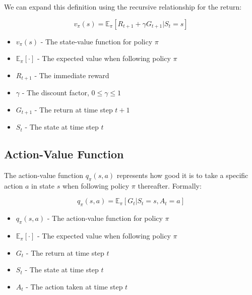\documentclass[12pt,a4paper]{article}
\begin{document}
We can expand this definition using the recursive relationship for the return:

\begin{equation}
v_\pi(s) = \mathbb{E}_\pi[R_{t+1} + \gamma G_{t+1} | S_t = s]
\end{equation}

\begin{tcolorbox}[title=Notation Overview]
\begin{itemize}
    \item $v_\pi(s)$ - The state-value function for policy $\pi$
    \item $\mathbb{E}_\pi[\cdot]$ - The expected value when following policy $\pi$
    \item $R_{t+1}$ - The immediate reward
    \item $\gamma$ - The discount factor, $0 \leq \gamma \leq 1$
    \item $G_{t+1}$ - The return at time step $t+1$
    \item $S_t$ - The state at time step $t$
\end{itemize}
\end{tcolorbox}

\subsection{Action-Value Function}

The action-value function $q_\pi(s,a)$ represents how good it is to take a specific action $a$ in state $s$ when following policy $\pi$ thereafter. Formally:

\begin{equation}
q_\pi(s,a) = \mathbb{E}_\pi[G_t | S_t = s, A_t = a]
\end{equation}

\begin{tcolorbox}[title=Notation Overview]
\begin{itemize}
    \item $q_\pi(s,a)$ - The action-value function for policy $\pi$
    \item $\mathbb{E}_\pi[\cdot]$ - The expected value when following policy $\pi$
    \item $G_t$ - The return at time step $t$
    \item $S_t$ - The state at time step $t$
    \item $A_t$ - The action taken at time step $t$
\end{itemize}
\end{tcolorbox}
\end{document}

